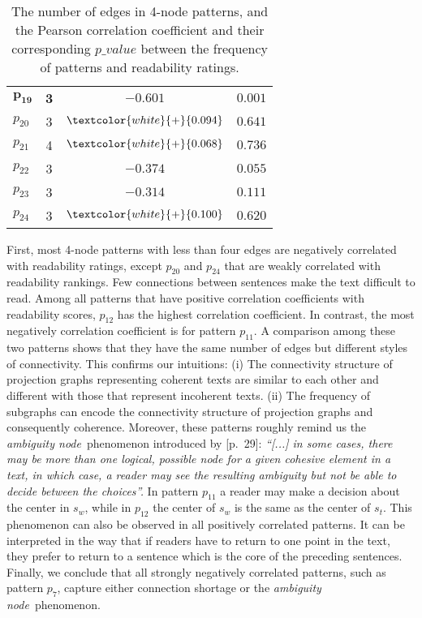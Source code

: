 \begin{table}[!ht]
\begin{center}
\begin{tabular}{lccc}
			$\mathbf{p_{19}}$	& \textbf{3} 	  & $\mathbf{-0.601}$ 				& $\mathbf{0.001}$			\\
			$p_{20}$			& 3 			  & $\textcolor{white}{+}{0.094}$   & $0.641$					\\
			$p_{21}$			& 4 			  & $\textcolor{white}{+}{0.068}$	& $0.736$				    \\
			$p_{22}$			& 3				  & $-0.374$ 						& $0.055$					\\
			$p_{23}$			& 3				  & $-0.314$ 						& $0.111$					\\
			$p_{24}$ 			& 3				  & $\textcolor{white}{+}{0.100}$   & $0.620$					\\
			\hline
		\end{tabular}
	\end{center}
	\caption{The number of edges in 4-node patterns, and the Pearson correlation coefficient and their corresponding $p\_value$ between the frequency of patterns and readability ratings.} 
	\label{tab:correlation-4node}
\end{table}

First, most 4-node patterns with less than four edges are negatively correlated with readability ratings, except $p_{20}$ and $p_{24}$ that are weakly correlated with readability rankings. 
Few connections between sentences make the text difficult to read.
Among all patterns that have positive correlation coefficients with readability scores, $p_{12}$ has the highest correlation coefficient. 
In contrast, the most negatively correlation coefficient is for pattern $p_{11}$. 
A comparison among these two patterns shows that they have the same number of edges but different styles of connectivity.
This confirms our intuitions: (i) The connectivity structure of projection graphs representing coherent texts are similar to each other and different with those that represent incoherent texts. 
(ii) The frequency of subgraphs can encode the connectivity structure of projection graphs and consequently coherence. 
Moreover, these patterns roughly remind us the \emph{ambiguity node}\ phenomenon introduced by  [p.\ 29]: 
\emph{
	``[...] in some cases, there may be more
	than one logical, possible node for a given cohesive element in a text, in which case, a reader may see the resulting ambiguity but not be able to decide between the choices''.
	}
In pattern $p_{11}$ a reader may make a decision about the center in $s_w$, while in $p_{12}$ the center of $s_w$ is the same as the center of $s_t$. 
This phenomenon can also be observed in all positively correlated patterns.  
It can be interpreted in the way that if readers have to return to one point in the text, they prefer to return to a sentence which is the core of the preceding sentences.
Finally, we conclude that all strongly negatively correlated patterns, such as pattern $p_7$, capture either connection shortage or the \textit{ambiguity node}\ phenomenon.

